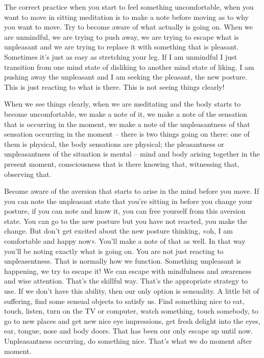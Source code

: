 \documentclass[letterpaper,10pt,english]{sphinxmanual}
\begin{document}
\sphinxAtStartPar
The correct practice when you start to feel something uncomfortable,
when you want to move in sitting meditation is to make a note before moving
as to why you want to move. Try to become aware of what actually is going
on. When we are unmindful, we are trying to push away, we are trying to
escape  what  is  unpleasant  and  we  are  trying  to  replace  it  with  something
that is pleasant. Sometimes it’s just as easy as stretching your leg. If I am
unmindful I just transition from one mind state of disliking to another mind
state of liking. I am pushing away the unpleasant and I am seeking the pleasant, the new posture. This is just reacting to what is there. This is not seeing
things clearly!

\sphinxAtStartPar
When  we  see  things  clearly,  when  we  are  meditating  and  the  body
starts to become uncomfortable, we make a note of it, we make a note of the
sensation that is occurring in the moment, we make a note of the unpleasantness of that sensation occurring in the moment – there is two things going on
there: one of them is physical, the body sensations are physical; the pleasantness or unpleasantness of the situation is mental – mind and body arising
together  in  the  present  moment,  consciousness  that  is  there  knowing  that,
witnessing that, observing that.

\sphinxAtStartPar
Become aware of the aversion that starts to arise in the mind before
you move. If you can note the unpleasant state that you’re sitting in before
you change your posture, if you can note and know it, you can free yourself
  from  this  aversion  state. You  can  go  to  the  new  posture  but  you  have  not
reacted, you make the change. But don’t get excited about the new posture
thinking,  «oh,  I  am  comfortable  and  happy  now».  You’ll  make  a  note  of
that  as  well.  In  that  way  you’ll  be  noting  exactly  what  is  going  on.  You
are not just reacting to unpleasentness. That is normally how we function.
Something unpleasant is happening, we try to escape it! We can escape with
mindfulness and awareness and wise attention. That’s the skillful way. That’s
the appropriate strategy to use. If we don’t have this ability, then our only
option is sensuality. A little bit of suffering, find some sensual objects to satisfy us. Find something nice to eat, touch, listen, turn on the TV or computer,
watch  something,  touch  somebody,  to  go  to  new  places  and  get  new  nice
eye impressions, get fresh delight into the eyes, ear, tongue, nose and body
doors. That has been our only escape up until now. Unpleasantness occurring, do something nice. That’s what we do moment after moment.
\end{document}
